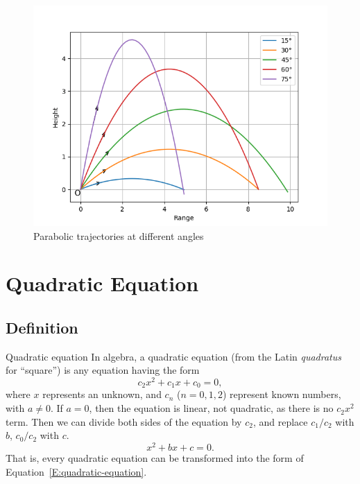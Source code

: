 \begin{figure}
    \centering
    \includegraphics[width=.7\textwidth]{figures/quadratic_equation-1.png}
    \caption{Parabolic trajectories at different angles}\label{F:trajectory}
\end{figure}



\section{Quadratic Equation}\label{S:quadratic}
\subsection{Definition}
\begin{defnbox}{Quadratic equation\cite{wiki:quadratic_equation}}
    In algebra, a quadratic equation (from the Latin \emph{quadratus} for ``square'') is any equation having the form
    \begin{equation}\label{E:1}
        c_2 x^2 + c_1 x + c_0 = 0,
    \end{equation}
    where $x$ represents an unknown, and $c_n$ ($n=0,1,2$) represent known numbers, with $a\neq 0$. If $a=0$, then the equation is linear, not quadratic, as there is no $c_2 x^2$ term. Then we can divide both sides of the equation by $c_2$, and replace $c_1/c_2$ with $b$, $c_0/c_2$ with $c$.
    \begin{equation}\label{E:quadratic-equation}
        x^2 + bx + c = 0.
    \end{equation}
    That is, every quadratic equation can be transformed into the form of Equation~\eqref{E:quadratic-equation}.
\end{defnbox}


